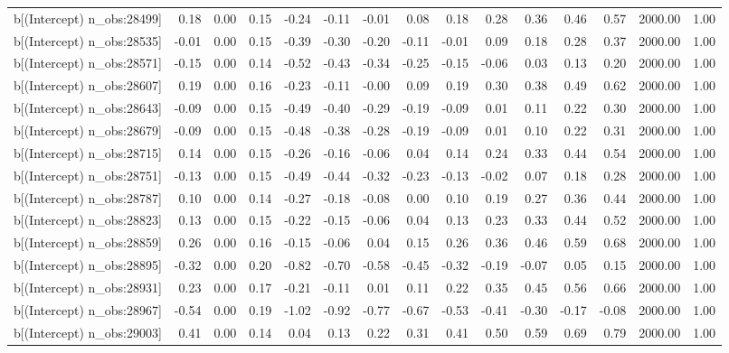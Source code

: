 \begin{table}[ht]
\begin{tabular}{rrrrrrrrrrrrrrr}
  b[(Intercept) n\_obs:28499] & 0.18 & 0.00 & 0.15 & -0.24 & -0.11 & -0.01 & 0.08 & 0.18 & 0.28 & 0.36 & 0.46 & 0.57 & 2000.00 & 1.00 \\ 
  b[(Intercept) n\_obs:28535] & -0.01 & 0.00 & 0.15 & -0.39 & -0.30 & -0.20 & -0.11 & -0.01 & 0.09 & 0.18 & 0.28 & 0.37 & 2000.00 & 1.00 \\ 
  b[(Intercept) n\_obs:28571] & -0.15 & 0.00 & 0.14 & -0.52 & -0.43 & -0.34 & -0.25 & -0.15 & -0.06 & 0.03 & 0.13 & 0.20 & 2000.00 & 1.00 \\ 
  b[(Intercept) n\_obs:28607] & 0.19 & 0.00 & 0.16 & -0.23 & -0.11 & -0.00 & 0.09 & 0.19 & 0.30 & 0.38 & 0.49 & 0.62 & 2000.00 & 1.00 \\ 
  b[(Intercept) n\_obs:28643] & -0.09 & 0.00 & 0.15 & -0.49 & -0.40 & -0.29 & -0.19 & -0.09 & 0.01 & 0.11 & 0.22 & 0.30 & 2000.00 & 1.00 \\ 
  b[(Intercept) n\_obs:28679] & -0.09 & 0.00 & 0.15 & -0.48 & -0.38 & -0.28 & -0.19 & -0.09 & 0.01 & 0.10 & 0.22 & 0.31 & 2000.00 & 1.00 \\ 
  b[(Intercept) n\_obs:28715] & 0.14 & 0.00 & 0.15 & -0.26 & -0.16 & -0.06 & 0.04 & 0.14 & 0.24 & 0.33 & 0.44 & 0.54 & 2000.00 & 1.00 \\ 
  b[(Intercept) n\_obs:28751] & -0.13 & 0.00 & 0.15 & -0.49 & -0.44 & -0.32 & -0.23 & -0.13 & -0.02 & 0.07 & 0.18 & 0.28 & 2000.00 & 1.00 \\ 
  b[(Intercept) n\_obs:28787] & 0.10 & 0.00 & 0.14 & -0.27 & -0.18 & -0.08 & 0.00 & 0.10 & 0.19 & 0.27 & 0.36 & 0.44 & 2000.00 & 1.00 \\ 
  b[(Intercept) n\_obs:28823] & 0.13 & 0.00 & 0.15 & -0.22 & -0.15 & -0.06 & 0.04 & 0.13 & 0.23 & 0.33 & 0.44 & 0.52 & 2000.00 & 1.00 \\ 
  b[(Intercept) n\_obs:28859] & 0.26 & 0.00 & 0.16 & -0.15 & -0.06 & 0.04 & 0.15 & 0.26 & 0.36 & 0.46 & 0.59 & 0.68 & 2000.00 & 1.00 \\ 
  b[(Intercept) n\_obs:28895] & -0.32 & 0.00 & 0.20 & -0.82 & -0.70 & -0.58 & -0.45 & -0.32 & -0.19 & -0.07 & 0.05 & 0.15 & 2000.00 & 1.00 \\ 
  b[(Intercept) n\_obs:28931] & 0.23 & 0.00 & 0.17 & -0.21 & -0.11 & 0.01 & 0.11 & 0.22 & 0.35 & 0.45 & 0.56 & 0.66 & 2000.00 & 1.00 \\ 
  b[(Intercept) n\_obs:28967] & -0.54 & 0.00 & 0.19 & -1.02 & -0.92 & -0.77 & -0.67 & -0.53 & -0.41 & -0.30 & -0.17 & -0.08 & 2000.00 & 1.00 \\ 
  b[(Intercept) n\_obs:29003] & 0.41 & 0.00 & 0.14 & 0.04 & 0.13 & 0.22 & 0.31 & 0.41 & 0.50 & 0.59 & 0.69 & 0.79 & 2000.00 & 1.00 \\ 

\end{tabular}
\end{table}
